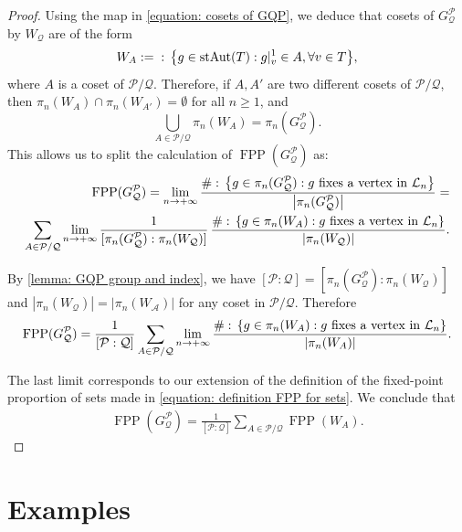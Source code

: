 \documentclass{amsart}
\def\set#1{{\def\st{\;:\;}\left\{#1\right\}}}
\def\abs#1{\left\vert{#1}\right\vert}
\DeclareMathOperator{\Aut}{Aut}
\DeclareMathOperator{\FPP}{FPP}
\DeclareMathOperator{\st}{st}
\begin{document}
\begin{proof}

Using the map in \cref{equation: cosets of GQP}, we deduce that cosets of $G_\mathcal{Q}^\mathcal{P}$ by $W_\mathcal{Q}$ are of the form $$W_A := \set{g \in \Aut(T): g|_v^1 \in A, \forall v \in T},$$ where $A$ is a coset of $\mathcal{P}/\mathcal{Q}$. Therefore, if $A,A'$ are two different cosets of $\mathcal{P}/\mathcal{Q}$, then $\pi_n(W_A) \cap \pi_n(W_{A'}) = \emptyset$ for all $n \geq 1$, and $$\bigcup_{A \in \mathcal{P}/\mathcal{Q}} \pi_n(W_A) = \pi_n(G_\mathcal{Q}^\mathcal{P}).$$ This allows us to split the calculation of $\FPP(G_\mathcal{Q}^\mathcal{P})$ as:
\begin{align*}
\FPP(G_\mathcal{Q}^\mathcal{P}) = \lim_{n \rightarrow +\infty} \frac{\#\set{g \in \pi_n(G_\mathcal{Q}^\mathcal{P}): \text{$g$ fixes a vertex in $\mathcal{L}_n$}}}{\abs{\pi_n(G_\mathcal{Q}^\mathcal{P})}} = \\  \sum_{A \in \mathcal{P}/\mathcal{Q}} \lim_{n \rightarrow +\infty} \frac{1}{[\pi_n(G_\mathcal{Q}^\mathcal{P}):\pi_n(W_\mathcal{Q})]} \, \frac{\#\set{g \in \pi_n(W_A): \text{$g$ fixes a vertex in $\mathcal{L}_n$}}}{\abs{\pi_n(W_\mathcal{Q})}}.
\end{align*}

By \cref{lemma: GQP group and index}, we have $[\mathcal{P}: \mathcal{Q}] = [\pi_n(G_\mathcal{Q}^\mathcal{P}):\pi_n(W_\mathcal{Q})]$ and $\abs{\pi_n(W_\mathcal{Q})} = \abs{\pi_n(W_\mathcal{A})}$ for any coset in $\mathcal{P}/\mathcal{Q}$. Therefore
\begin{align*}
\FPP(G_\mathcal{Q}^\mathcal{P}) = \frac{1}{[\mathcal{P}:\mathcal{Q}]}  \sum_{A \in \mathcal{P}/\mathcal{Q}} \lim_{n \rightarrow +\infty} \frac{\#\set{g \in \pi_n(W_A): \text{$g$ fixes a vertex in $\mathcal{L}_n$}}}{\abs{\pi_n(W_A)}}.
\end{align*}

The last limit corresponds to our extension of the definition of the fixed-point proportion of sets made in \cref{equation: definition FPP for sets}. We conclude that
\begin{align*}
\FPP(G_\mathcal{Q}^\mathcal{P}) = \frac{1}{[\mathcal{P}: \mathcal{Q}]} \sum_{A \in \mathcal{P}/\mathcal{Q}} \FPP(W_A). 
\end{align*}
\end{proof}



\section{Examples}
\label{section: examples}
\end{document}
